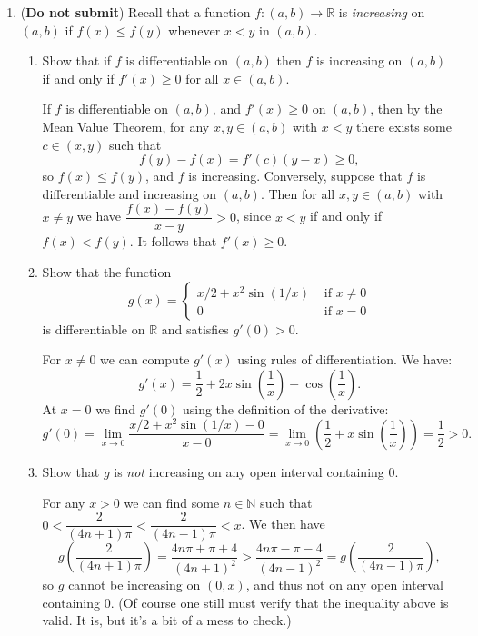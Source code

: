\documentclass[letterpaper,12pt]{article}
\newcommand{\R}{\mathbb{R}}
\newcommand{\N}{\mathbb{N}}
\begin{document}
\begin{enumerate}
 \bigskip
 
 \item ({\bf Do not submit}) Recall that a function $f:(a,b)\to\R$ is {\em increasing} on $(a,b)$ if $f(x)\leq f(y)$ whenever $x<y$ in $(a,b)$.
\begin{enumerate}
 \item Show that if $f$ is differentiable on $(a,b)$ then $f$ is increasing on $(a,b)$ if and only if $f'(x)\geq 0$ for all $x\in (a,b)$.
 
 \bigskip
 
 If $f$ is differentiable on $(a,b)$, and $f'(x)\geq 0$ on $(a,b)$, then by the Mean Value Theorem, for any $x,y\in (a,b)$ with $x<y$ there exists some $c\in (x,y)$ such that
 \[
 f(y)-f(x) = f'(c)(y-x) \geq 0,
 \]
 so $f(x)\leq f(y)$, and $f$ is increasing. Conversely, suppose that $f$ is differentiable and increasing on $(a,b)$. Then for all $x,y\in (a,b)$ with $x\neq y$ we have $\dfrac{f(x)-f(y)}{x-y}>0$, since $x<y$ if and only if $f(x)<f(y)$. It follows that $f'(x)\geq 0$.
 
 \bigskip
 
 \item Show that the function
\[
 g(x) = \begin{cases} x/2+x^2\sin(1/x) & \text{ if } x\neq 0 \\ 0 & \text{ if } x=0\end{cases}
\]
is differentiable on $\R$ and satisfies $g'(0)>0$.

\bigskip

For $x\neq 0$ we can compute $g'(x)$ using rules of differentiation. We have:
\[
g'(x) = \frac{1}{2} + 2x\sin\left(\frac{1}{x}\right)-\cos\left(\frac{1}{x}\right).
\]
At $x=0$ we find $g'(0)$ using the definition of the derivative:
\[
g'(0) = \lim_{x\to 0}\frac{x/2+x^2\sin(1/x)-0}{x-0} = \lim_{x\to 0}\left(\frac{1}{2}+x\sin\left(\frac{1}{x}\right)\right) = \frac{1}{2}>0.
\]

\bigskip

 \item Show that $g$ is {\em not} increasing on any open interval containing 0.
 
 \bigskip
 
 For any $x>0$ we can find some $n\in\N$ such that  $0<\dfrac{2}{(4n+1)\pi}<\dfrac{2}{(4n-1)\pi}<x$. We then have
 \[
g\left(\frac{2}{(4n+1)\pi}\right) = \frac{4n\pi+\pi+4}{(4n+1)^2}>\frac{4n\pi-\pi-4}{(4n-1)^2} = g\left(\frac{2}{(4n-1)\pi}\right),
 \]
 so $g$ cannot be increasing on $(0,x)$, and thus not on any open interval containing 0. (Of course one still must verify that the inequality above is valid. It is, but it's a bit of a mess to check.)
 

\end{enumerate}
\end{enumerate}
\end{document}
